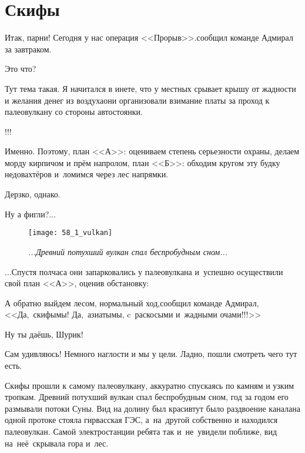 \chapter{Скифы}
\vepsianrose

\diagdash Итак, парни! Сегодня у нас операция <<Прорыв>>.\mdash сообщил команде Адмирал за завтраком.

\diagdash Это что?

\diagdash Тут тема такая. Я начитался в инете, что у местных срывает крышу от жадности и желания денег из воздуха\mdash они организовали взимание платы за проход к палеовулкану со стороны автостоянки.

\diagdash !!!

\diagdash Именно. Поэтому, план <<А>>: оцениваем степень серьезности охраны, делаем морду кирпичом и прём напролом, план <<Б>>: обходим кругом эту будку недовахтёров и~ломимся через лес напрямки.

\diagdash Дерзко, однако.

\diagdash Ну а фигли?$\ldots$

\newpage

\begin{figure}[h]
	\centering
	\texttt{[image: 58\_1\_vulkan]}
	\caption{\small\textit{...Древний потухший вулкан спал беспробудным сном...}}
\end{figure}

$\ldots$Спустя полчаса они запарковались у палеовулкана и~успешно осуществили свой план <<А>>, оценив обстановку:

\diagdash А обратно выйдем лесом, нормальный ход,\mdash сообщил команде Адмирал,\mdash <<Да,~скифы\mdash мы! Да,~азиаты\mdash мы, c~раскосыми и~жадными очами!!!>>

\diagdash Ну ты даёшь, Шурик!

\diagdash Сам удивляюсь! Немного наглости и мы у цели. Ладно, пошли смотреть чего тут есть.

Скифы прошли к самому палеовулкану, аккуратно спускаясь по камням и узким тропкам. Древний потухший вулкан спал беспробудным сном, год за годом его размывали потоки Суны. Вид на долину был красив\mdash тут было раздвоение канала\mdash на одной протоке стояла гирвасская ГЭС, а~на~другой собственно и находился палеовулкан. Самой электростанции ребята так и~не~увидели поближе, вид на~неё~скрывала гора и~лес. 

